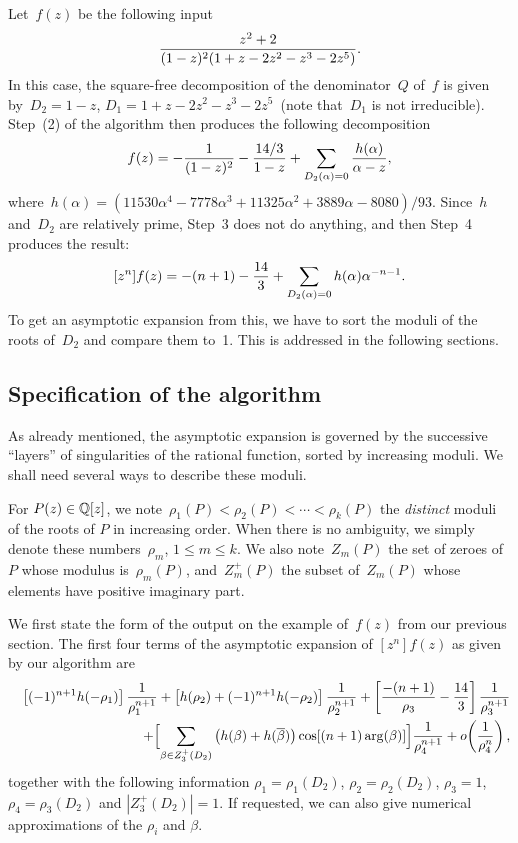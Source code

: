  Let~$f(z)$ be the following input 
$${z^2+2 \over (1-z)^2(1+z-2z^2-z^3-2z^5)}.$$
In this case, the square-free decomposition of the denominator~$Q$
of~$f$ is given by~$D_2=1-z$, $D_1=1+z-2z^2-z^3-2z^5$~(note that~$D_1$
is not irreducible). Step~(2) of the algorithm then produces the
following decomposition
\[f(z)=-{1\over(1-z)^2}-{14/3\over1-z}+\sum_{D_2(\alpha)=0}{h(\alpha)\over
\alpha-z},\]
where~$h(\alpha)=
(11530\alpha^4-7778\alpha^3+11325\alpha^2+3889\alpha-8080)/93$.
Since~$h$ and~$D_2$ are relatively prime, Step~3 does not do
anything, and then Step~4 produces the result:
\[[z^n]f(z)=-(n+1)-{14\over3}+\sum_{D_2(\alpha)=0}{h(\alpha)\alpha^{-n-1}}.\]
To get an asymptotic expansion from this, we have to sort the
moduli of the roots of~$D_2$ and compare them to~1. This is addressed
in the following sections.

\subsection{Specification of the algorithm}

As already mentioned, the asymptotic expansion is governed by the
successive ``layers'' of singularities of the rational function,
sorted by increasing moduli. We shall need several ways to describe
these moduli.

\begin{nota} For $P(z)\in{\Bbb Q}[z]$, we note~$\rho_1(P) <
\rho_2(P) < \cdots < \rho_k(P)$ the \/{\em distinct} moduli of the roots of
$P$ in increasing order. When there is no ambiguity, we simply denote
these numbers~$\rho_m$, $1\le m\le k$. We also note~$Z_m(P)$ the set of zeroes
of~$P$ whose modulus is~$\rho_m(P)$, and~$Z_m^+(P)$ the subset
of~$Z_m(P)$ whose elements have positive imaginary part.
\end{nota}

We first state the form of the output on the example of~$f(z)$ from
our previous section.
The first four terms of the asymptotic expansion of $[z^n]f(z)$
as given
by our algorithm are
\begin{eqnarray*}
&&\left[ (-1)^{n+1} h(-\rho_1) \right] {1 \over \rho_1^{n+1}} + 
\left[h(\rho_2) + (-1)^{n+1} h(-\rho_2) \right] {1 \over
\rho_2^{n+1}} 
+ \left[ {-(n+1) \over \rho_3 } - {14 \over 3} \right] {1 \over
\rho_3^{n+1}}\\ 
&&\quad\quad +
\Bigl[ \sum_{\beta\in Z_3^+(D_2)}
\left( h(\beta)+h(\overline{\beta}) \right)
\cos[(n+1)\arg(\beta)] \Bigr] {1 \over \rho_4^{n+1}}
+o\!\left({1\over\rho_4^n}\right) , 
\end{eqnarray*}
together with the following information
$\rho_1=\rho_1(D_2)$, $\rho_2=\rho_2(D_2)$, $\rho_3=1$, $\rho_4=\rho_3(D_2)$
and $|Z_3^+(D_2)|=1$.
If requested, we can also give numerical approximations of the
$\rho_i$ and $\beta$.

